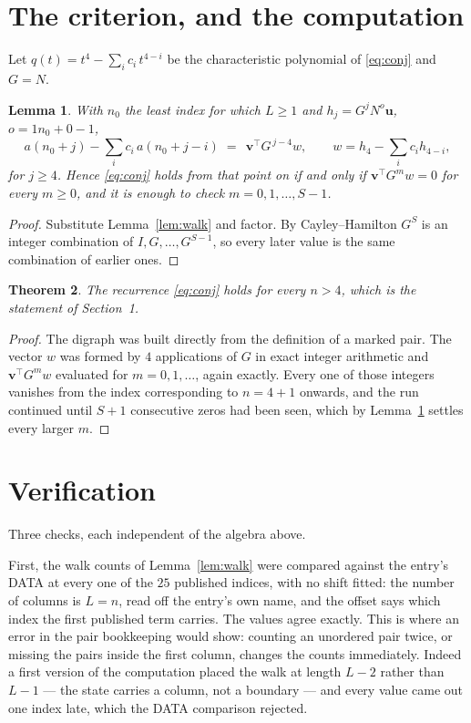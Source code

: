 \documentclass[11pt,a4paper]{article}
\theoremstyle{plain}
\newtheorem{theorem}{Theorem}
\newtheorem{lemma}[theorem]{Lemma}
\theoremstyle{definition}
\begin{document}
\section{The criterion, and the computation}

Let $q(t)=t^{4}-\sum_i c_i\,t^{4-i}$ be the characteristic polynomial of
\eqref{eq:conj} and $G=N$.

\begin{lemma}\label{lem:crit}
With $n_0$ the least index for which $L\ge1$ and $h_j=G^{j}N^{o}\mathbf{u}$,
$o=1n_0+0-1$,
\[
a(n_0+j)-\sum_i c_i\,a(n_0+j-i)\;=\;\,\mathbf{v}^{\!\top}G^{\,j-4}w,
\qquad w=h_{4}-\sum_i c_i h_{4-i},
\]
for $j\ge4$. Hence \eqref{eq:conj} holds from that point on if and only if
$\mathbf{v}^{\!\top}G^{m}w=0$ for every $m\ge0$, and it is enough to check
$m=0,1,\dots,S-1$.
\end{lemma}

\begin{proof}
Substitute Lemma~\ref{lem:walk} and factor. By Cayley--Hamilton $G^{S}$ is an integer
combination of $I,G,\dots,G^{S-1}$, so every later value is the same combination of earlier
ones.
\end{proof}

\begin{theorem}
The recurrence \eqref{eq:conj} holds for every $n>4$, which is the statement of
Section~1.
\end{theorem}

\begin{proof}
The digraph was built directly from the definition of a marked pair. The vector $w$ was
formed by $4$ applications of $G$ in exact integer arithmetic and
$\mathbf{v}^{\!\top}G^{m}w$ evaluated for $m=0,1,\dots$, again exactly. Every one of
those integers vanishes from the index corresponding to $n=4+1$ onwards, and the run
continued until $S+1$ consecutive zeros had been seen, which by Lemma~\ref{lem:crit}
settles every larger $m$.
\end{proof}

\section{Verification}

Three checks, each independent of the algebra above.

First, the walk counts of Lemma~\ref{lem:walk} were compared against the entry's DATA at
every one of the $25$ published indices, with no shift fitted: the number of columns is
$L=n$, read off the entry's own name, and the offset says which index the first
published term carries. The values agree exactly. This is where an error in the pair
bookkeeping would show: counting an unordered pair twice, or missing the pairs inside the
first column, changes the counts immediately. Indeed a first version of the computation
placed the walk at length $L-2$ rather than $L-1$ --- the state carries a column, not a
boundary --- and every value came out one index late, which the DATA comparison rejected.
\end{document}
